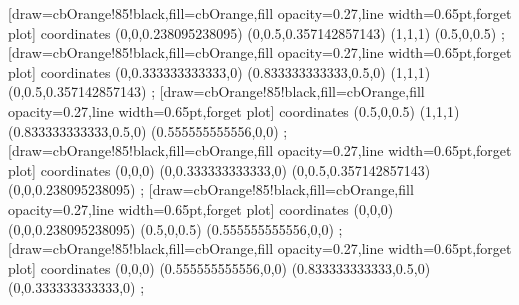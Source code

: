 [draw=cbOrange!85!black,fill=cbOrange,fill opacity=0.27,line width=0.65pt,forget plot] coordinates {
  (0,0,0.238095238095)
  (0,0.5,0.357142857143)
  (1,1,1)
  (0.5,0,0.5)
} \closedcycle;
[draw=cbOrange!85!black,fill=cbOrange,fill opacity=0.27,line width=0.65pt,forget plot] coordinates {
  (0,0.333333333333,0)
  (0.833333333333,0.5,0)
  (1,1,1)
  (0,0.5,0.357142857143)
} \closedcycle;
[draw=cbOrange!85!black,fill=cbOrange,fill opacity=0.27,line width=0.65pt,forget plot] coordinates {
  (0.5,0,0.5)
  (1,1,1)
  (0.833333333333,0.5,0)
  (0.555555555556,0,0)
} \closedcycle;
[draw=cbOrange!85!black,fill=cbOrange,fill opacity=0.27,line width=0.65pt,forget plot] coordinates {
  (0,0,0)
  (0,0.333333333333,0)
  (0,0.5,0.357142857143)
  (0,0,0.238095238095)
} \closedcycle;
[draw=cbOrange!85!black,fill=cbOrange,fill opacity=0.27,line width=0.65pt,forget plot] coordinates {
  (0,0,0)
  (0,0,0.238095238095)
  (0.5,0,0.5)
  (0.555555555556,0,0)
} \closedcycle;
[draw=cbOrange!85!black,fill=cbOrange,fill opacity=0.27,line width=0.65pt,forget plot] coordinates {
  (0,0,0)
  (0.555555555556,0,0)
  (0.833333333333,0.5,0)
  (0,0.333333333333,0)
} \closedcycle;
